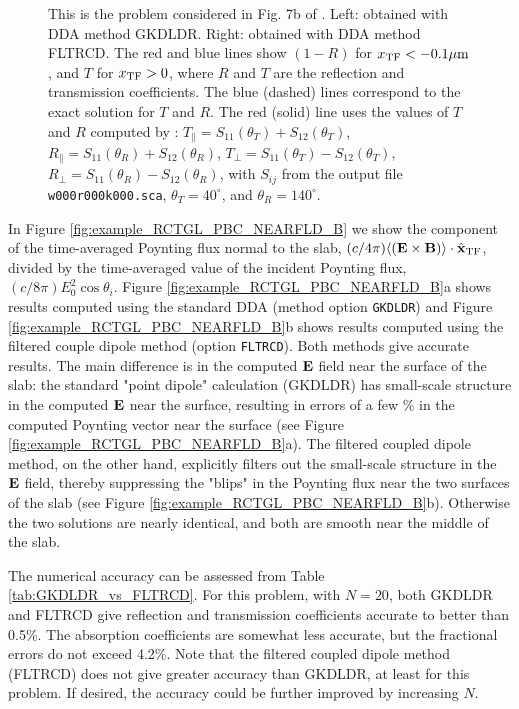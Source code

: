 \begin{figure}[h]
\begin{center}
{         This is the problem considered in Fig. 7b of 
         \citet{Draine+Flatau_2008a}.
         Left: obtained with DDA method GKDLDR.
         Right: obtained with DDA method FLTRCD.
         The red and blue lines show $(1-R)$ for $x_{\rm TF}<-0.1{\mu{\rm m}}$, 
         and $T$ for $x_{\rm TF}>0$,
         where $R$ and $T$ are the reflection and transmission coefficients.
         The blue (dashed) lines correspond to the
         exact solution for $T$ and $R$.  The red (solid) line uses the
         values of $T$ and $R$ computed by \ddscatv:
         $T_\parallel=S_{11}(\theta_T)+S_{12}(\theta_T)$,
         $R_\parallel=S_{11}(\theta_R)+S_{12}(\theta_R)$,
         $T_\perp=S_{11}(\theta_T)-S_{12}(\theta_T)$,
         $R_\perp=S_{11}(\theta_R)-S_{12}(\theta_R)$,
         with $S_{ij}$ from the output file 
         {\tt w000r000k000.sca}, $\theta_T=40^\circ$, and
         $\theta_R=140^\circ$.
         }
\end{center}
\end{figure}

In Figure \ref{fig:example_RCTGL_PBC_NEARFLD_B} we show
the component of the time-averaged Poynting flux normal to the slab,
$(c/4\pi)\langle({\bf E}\times{\bf B})\rangle\cdot \hat{\bf x}_{\rm TF}$, divided by the time-averaged
value of the incident
Poynting flux, $(c/8\pi)E_0^2\cos\theta_i$.
Figure \ref{fig:example_RCTGL_PBC_NEARFLD_B}a shows results computed
using the standard DDA (method option {\tt GKDLDR}) and Figure 
\ref{fig:example_RCTGL_PBC_NEARFLD_B}b shows results computed using
the filtered couple dipole method (option {\tt FLTRCD}).
Both methods give accurate results.
The main difference is in the computed ${\bf E}$ field near the surface of
the slab: the standard "point dipole" calculation (GKDLDR) has small-scale
structure in the computed ${\bf E}$ near the surface, resulting in errors of
a few \% in the computed Poynting vector near the surface (see Figure
\ref{fig:example_RCTGL_PBC_NEARFLD_B}a).
The filtered coupled dipole method, on the other hand, explicitly filters
out the small-scale structure in the ${\bf E}$ field, thereby suppressing
the "blips" in the Poynting flux near the two surfaces of the slab
(see Figure \ref{fig:example_RCTGL_PBC_NEARFLD_B}b).
Otherwise the two solutions are nearly identical, and both are smooth
near the middle of the slab.

The numerical accuracy can be assessed from Table \ref{tab:GKDLDR_vs_FLTRCD}.
For this problem, with $N=20$, 
both GKDLDR and FLTRCD give reflection and transmission coefficients
accurate to better than 0.5\%.
The absorption coefficients are somewhat less accurate, but the
fractional errors do not exceed 4.2\%.
Note that the filtered coupled dipole method (FLTRCD)
does not give greater accuracy than GKDLDR, at least for this problem.
If desired, the accuracy could be further improved by increasing $N$.

